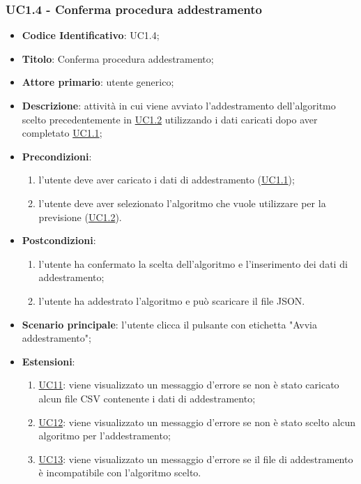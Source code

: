 	\label{par:UC1.4}
	\subsubsection{UC1.4 - Conferma procedura addestramento}
		\begin{itemize}
			\item\textbf{Codice Identificativo}: UC1.4;
			\item\textbf{Titolo}: Conferma procedura addestramento;
			\item\textbf{Attore primario}: utente generico;
			\item\textbf{Descrizione}: attività in cui viene avviato l'addestramento dell'algoritmo scelto precedentemente in \hyperref[par:UC1.2]{UC1.2} utilizzando i dati caricati dopo aver completato \hyperref[par:UC1.1]{UC1.1};
			\item\textbf{Precondizioni}:
				\begin{enumerate}
					\item l'utente deve aver caricato i dati di addestramento (\hyperref[par:UC1.1]{UC1.1});
					\item l'utente deve aver selezionato l'algoritmo che vuole utilizzare per la previsione (\hyperref[par:UC1.2]{UC1.2}).
				\end{enumerate}
			\item\textbf{Postcondizioni}:
				\begin{enumerate}
					\item l'utente ha confermato la scelta dell'algoritmo e l'inserimento dei dati di addestramento;
					\item l'utente ha addestrato l'algoritmo e può scaricare il file JSON.
				\end{enumerate}
			\item\textbf{Scenario principale}: l'utente clicca il pulsante con etichetta "Avvia addestramento";
			\item\textbf{Estensioni}:
			\begin{enumerate}
				\item \hyperref[par:UC11]{UC11}: viene visualizzato un messaggio d'errore se non è stato caricato alcun file CSV contenente i dati di addestramento;
				\item \hyperref[par:UC12]{UC12}: viene visualizzato un messaggio d'errore se non è stato scelto alcun algoritmo per l'addestramento;
				\item \hyperref[par:UC13]{UC13}: viene visualizzato un messaggio d'errore se il file di addestramento è incompatibile con l'algoritmo scelto.
			\end{enumerate}
			 
						
		\end{itemize}
		
